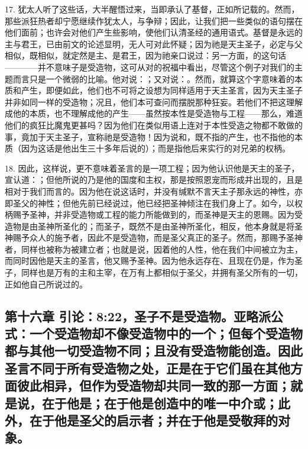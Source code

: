 17. 犹太人听了这些话，大半醒悟过来，当即承认了基督，正如所记载的。然而，那些派狂热者却宁愿继续作犹太人，与争辩；因此，让我们把一些类似的语句摆在他们面前；也许会对他们产生些影响，使他们认清圣经的通用语式。基督是永远的主与君王，已由前文的论述显明，无人可对此怀疑；因为祂是天主圣子，必定与父相似，既相似，就定然是主、是君王，因为祂亲口说过：另一方面，的这句话————并不意味子是受造物，这可从对的祝福中看出，尽管这个例子对我们的主题而言只是一个微弱的比喻。他对说：；又对说：。然而，就算这个字意味着的本质和产生，即便如此，他们也不可将之设想为同样适用于天主圣言，因为天主圣子并非如同一样的受造物；况且，他们本可查问而摆脱那种狂妄。若他们不把这理解成他的本质，也不理解成他的产生——虽然按本性是受造物与工程——那么，难道他们的疯狂比魔鬼更甚吗？因为他们在类似用语上连对于本性受造之物都不敢做的事，竟加于天主圣子，宣称祂是受造物！因为说和，既不指的产生，也不指他的本质（因为这话是他出生三十多年后说的）；而是指他后来实行的对兄弟的权柄。\par

18. 因此，这样说，更不意味着圣言的是一项工程；因为他认识他是天主的圣子，宣认道：；但他所说的乃是他的国度和主权，那是按照恩宠而形成并出现的，且是相对于我们而言的。因为他在说这话时，并没有缄默不言天主子那永远的神性，亦即圣父的神性；但他先前已经说过，他已经把圣神倾注在我们身上了。如今，以权柄赐予圣神，并非受造物或工程的能力所能做到的，而圣神是天主的恩赐。因为受造物是由圣神所圣化的；而圣子，既然不是由圣神所圣化，相反，他本身就是将圣神赐予众人的施予者，因此不是受造物，而是圣父真正的圣子。然而，那赐予圣神者，同样也被称为被建立者；也就是说，因着他的人性，他在我们中间被立为主，而同时因他是天主的圣言，他又赐予圣神。因为他永远存在、且现在仍是，作为圣子，同样也是万有的主和主宰，在万有上都相似于圣父，并拥有圣父所有的一切，正如他自己所说过的。\par


\subsection{第十六章 引论：8:22，圣子不是受造物。亚略派公式：一个受造物却不像受造物中的一个；但每个受造物都与其他一切受造物不同；且没有受造物能创造。因此圣言不同于所有受造物之处，正是在于它们虽在其他方面彼此相异，但作为受造物却共同一致的那一方面；就是说，在于他是；在于他是创造中的唯一中介或；此外，在于他是圣父的启示者；并在于他是受敬拜的对象。}


